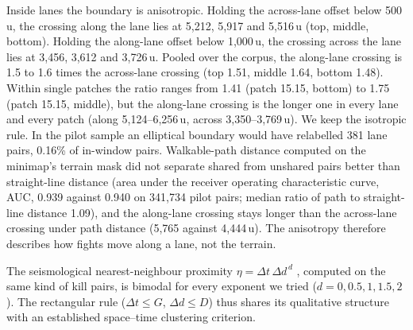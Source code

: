 Inside lanes the boundary is anisotropic. Holding the across-lane offset below 500\,u, the crossing
along the lane lies at 5,212, 5,917 and 5,516\,u (top, middle, bottom). Holding the along-lane offset
below 1,000\,u, the crossing across the lane lies at 3,456, 3,612 and 3,726\,u. Pooled over the corpus,
the along-lane crossing is 1.5 to 1.6 times the across-lane crossing (top 1.51, middle 1.64, bottom
1.48). Within single patches the ratio ranges from 1.41 (patch 15.15, bottom) to 1.75 (patch 15.15,
middle), but the along-lane crossing is the longer one in every lane and every patch (along
5,124--6,256\,u, across 3,350--3,769\,u).
We keep the isotropic rule. In the pilot sample an elliptical boundary would have relabelled 381 lane
pairs, 0.16\% of in-window pairs. Walkable-path distance computed on the minimap's terrain mask did not
separate shared from unshared pairs better than straight-line distance (area under the receiver
operating characteristic curve, AUC, 0.939 against 0.940 on 341,734 pilot pairs; median ratio of path
to straight-line distance 1.09), and the along-lane crossing stays longer than the across-lane crossing
under path distance (5,765 against 4,444\,u). The anisotropy therefore describes how fights move along
a lane, not the terrain.

The seismological nearest-neighbour proximity $\eta = \Delta t\,\Delta d^{\,d}$
\cite{zaliapin2013clusters,zaliapin2022perspectives}, computed on the same kind of kill pairs, is
bimodal for every exponent we tried ($d = 0, 0.5, 1, 1.5, 2$). The rectangular rule
($\Delta t \leq G$, $\Delta d \leq D$) thus shares its qualitative structure with an established
space--time clustering criterion.

